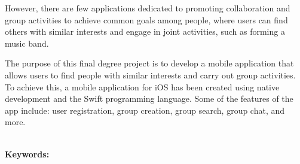 \documentclass{book}
\begin{document}
However, there are few applications dedicated to promoting collaboration 
and group activities to achieve common goals among people, where users can 
find others with similar interests and engage in joint activities, such as 
forming a music band.

The purpose of this final degree project is to develop a mobile application 
that allows users to find people with similar interests and carry out group 
activities. To achieve this, a mobile application for iOS has been created 
using native development and the Swift programming language. Some of the 
features of the app include: user registration, group creation, group search, 
group chat, and more.

\textbf{\\\large Keywords: }
\endgroup
\begin{comment}
\begin{table}[ht]
    \centering
    \begin{tabular}{|m{3cm}|m{10cm}|}
        \hline
        \rowcolor{blue!20} Primary Actors        & Usuario                   \\
        \hline
        Level                                    & N/A                       \\
        \hline
        \rowcolor{blue!20} Complexity            & Low                       \\
        \hline
        Use Case Status                          & N/A                       \\
        \hline
        \rowcolor{blue!20} Implementation Status & N/A                       \\
        \hline
        Preconditions                            & N/A                       \\
        \hline
        \rowcolor{blue!20} Post-conditions       & N/A                       \\
        \hline
        Author                                   & Matvey Dergunov Bushmanov \\
        \hline
        \rowcolor{blue!20} Assumptions           & N/A                       \\
        \hline
    \end{tabular}
    \caption{Abandonar grupo Requirements Spec}
\end{table}
\end{comment}
\tableofcontents
\end{document}
